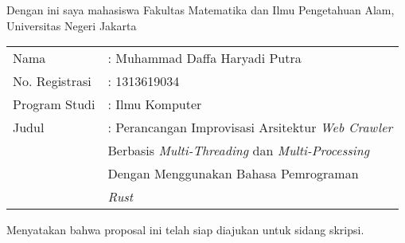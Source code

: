 \chapter*{}
\thispagestyle{empty} {\bf }Dengan ini saya mahasiswa Fakultas
Matematika dan Ilmu Pengetahuan Alam, Universitas Negeri Jakarta

\vskip3mm

\begin{tabular}{ll}
  Nama & : Muhammad Daffa Haryadi Putra \\
  No. Registrasi & : 1313619034\\
  Program Studi & : Ilmu Komputer \\
  Judul & : Perancangan Improvisasi Arsitektur \emph{Web Crawler} \\ & \hspace{0.2cm} Berbasis \emph{Multi-Threading} dan \emph{Multi-Processing} \\ & \hspace{0.2cm} Dengan Menggunakan Bahasa Pemrograman \\ & \hspace{0.2cm} \emph{Rust} \\
\end{tabular}

\vskip4mm

\noindent \hskip10mm Menyatakan bahwa proposal ini telah siap diajukan untuk sidang skripsi.



